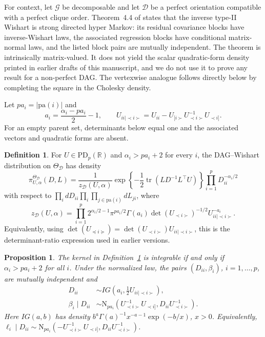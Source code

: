 \documentclass[12pt]{article}
\newcommand{\R}{\mathbb{R}}
\DeclareMathOperator{\tr}{tr}
\newcommand{\D}{\mathcal{D}}
\newcommand{\G}{\mathcal{G}}
\theoremstyle{plain}
\newtheorem{proposition}[theorem]{Proposition}
\theoremstyle{definition}
\newtheorem{definition}[theorem]{Definition}
\theoremstyle{remark}
\begin{document}
 \vspace{2mm}
 
For context, let $\G$ be decomposable and let $\D$ be a perfect
orientation compatible with a perfect clique order.  Theorem~4.4 of
\cite{letac07*} states that the inverse type-II Wishart is strong
directed hyper Markov: its residual covariance blocks have
inverse-Wishart laws, the associated regression blocks have conditional
matrix-normal laws, and the listed block pairs are mutually independent.
The theorem is intrinsically matrix-valued.  It does not yield the scalar
quadratic-form density printed in earlier drafts of this manuscript, and
we do not use it to prove any result for a non-perfect DAG.  The
vertexwise analogue follows directly below by completing the square in
the Cholesky density.

Let \(pa_i=|\mathrm{pa}(i)|\) and
\[
a_i=\frac{\alpha_i-pa_i}{2}-1,
\qquad
U_{ii\mid\prec i\succ}
=U_{ii}-U_{[i\succ}U_{\prec i\succ}^{-1}U_{\prec i]}.
\]
For an empty parent set, determinants below equal one and the associated
vectors and quadratic forms are absent.

\begin{definition}\label{def:dagwishart}
For \(U\in\mathrm{PD}_p(\R)\) and
\(\alpha_i>pa_i+2\) for every \(i\), the DAG--Wishart distribution on
\(\Theta_{\D}\) has density
\[
\pi_{U,\alpha}^{\Theta_{\D}}(D,L)
=\frac{1}{z_{\D}(U,\alpha)}
\exp\!\left\{-\frac12\tr(LD^{-1}L^\top U)\right\}
\prod_{i=1}^pD_{ii}^{-\alpha_i/2}
\]
with respect to \(\prod_i dD_{ii}\prod_i\prod_{j\in
\mathrm{pa}(i)}dL_{ji}\), where
\begin{equation}\label{eq:zd}
z_{\D}(U,\alpha)
=\prod_{i=1}^{p}
2^{\alpha_i/2-1}\pi^{pa_i/2}\Gamma(a_i)
\det(U_{\prec i\succ})^{-1/2}
U_{ii\mid\prec i\succ}^{-a_i}.
\end{equation}
Equivalently, using
\(\det(U_{\preceq i\succeq})
=\det(U_{\prec i\succ})U_{ii\mid\prec i\succ}\),
this is the determinant-ratio expression used in earlier versions.
\end{definition}

\begin{proposition}\label{prop:nodewise}
The kernel in Definition~\ref{def:dagwishart} is integrable if and only
if \(\alpha_i>pa_i+2\) for all \(i\).  Under the normalized law, the
pairs \((D_{ii},\beta_i)\), \(i=1,\ldots,p\), are mutually independent
and
\begin{align}
\label{eq:dii1}
D_{ii}&\sim
IG\!\left(a_i,\frac12U_{ii\mid\prec i\succ}\right),\\
\label{eq:dii2}
\beta_i\mid D_{ii}&\sim
\mathrm{N}_{pa_i}\!\left(
U_{\prec i\succ}^{-1}U_{\prec i]},
D_{ii}U_{\prec i\succ}^{-1}\right).
\end{align}
Here \(IG(a,b)\) has density
\(b^a\Gamma(a)^{-1}x^{-a-1}\exp(-b/x)\), \(x>0\).
Equivalently,
\(\ell_i\mid D_{ii}\sim
\mathrm{N}_{pa_i}(-U_{\prec i\succ}^{-1}U_{\prec i]},
D_{ii}U_{\prec i\succ}^{-1})\).
\end{proposition}
\end{document}
